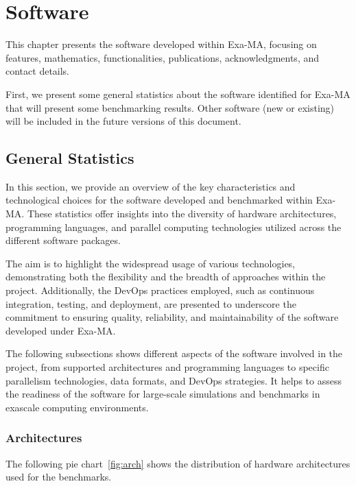 \clearpage
\chapter{Software}
\label{sec:software}

This chapter presents the software developed within Exa-MA, focusing on features, mathematics, functionalities, publications, acknowledgments, and contact details.

First, we present some general statistics about the software identified for Exa-MA that will present some benchmarking results. 
Other software (new or existing) will be included in the future versions of this document.


\section{General Statistics}
\label{sec:software:statistics}

In this section, we provide an overview of the key characteristics and technological choices for the software developed and benchmarked within Exa-MA. 
These statistics offer insights into the diversity of hardware architectures, programming languages, and parallel computing technologies utilized across the different software packages. 

The aim is to highlight the widespread usage of various technologies, demonstrating both the flexibility and the breadth of approaches within the project. 
Additionally, the DevOps practices employed, such as continuous integration, testing, and deployment, are presented to underscore the commitment to ensuring quality, reliability, and maintainability of the software developed under Exa-MA.

The following subsections shows different aspects of the software involved in the project, from supported architectures and programming languages to specific parallelism technologies, data formats, and DevOps strategies. 
It helps to assess the readiness of the software for large-scale simulations and benchmarks in exascale computing environments.


\subsection{Architectures}

The following pie chart~\ref{fig:arch} shows the distribution of hardware architectures used for the benchmarks.


